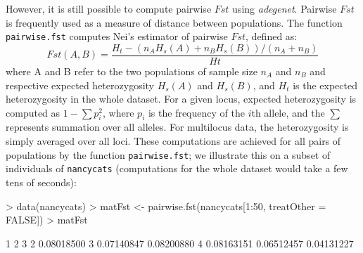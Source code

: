 \documentclass{article}
\begin{document}







However, it is still possible to compute pairwise $Fst$ using \textit{adegenet}.
Pairwise $Fst$ is frequently used as a measure of distance between populations.
The function \texttt{pairwise.fst} computes Nei's estimator \cite{tj814} of pairwise $Fst$, defined as:
$$
Fst(A,B) = \frac{H_t - (n_AH_s(A) + n_BH_s(B))/(n_A + n_B)}{Ht}
$$
where A and B refer to the two populations of sample size $n_A$ and $n_B$ and respective
expected heterozygosity $H_s(A)$ and $H_s(B)$, and $H_t$ is the expected heterozygosity in the whole dataset.
For a given locus, expected heterozygosity is computed as $1 - \sum p_i^2$, where $p_i$ is the
frequency of the $i$th allele, and the $\sum$ represents summation over all alleles.
For multilocus data, the heterozygosity is simply averaged over all loci.
These computations are achieved for all pairs of populations by the function \texttt{pairwise.fst}; we
illustrate this on a subset of individuals of \texttt{nancycats} (computations for the whole dataset
would take a few tens of seconds):
\begin{Schunk}
\begin{Sinput}
> data(nancycats)
> matFst <- pairwise.fst(nancycats[1:50, treatOther = FALSE])
> matFst
\end{Sinput}
\begin{Soutput}
           1          2          3
2 0.08018500                      
3 0.07140847 0.08200880           
4 0.08163151 0.06512457 0.04131227
\end{Soutput}
\end{Schunk}
\end{document}

